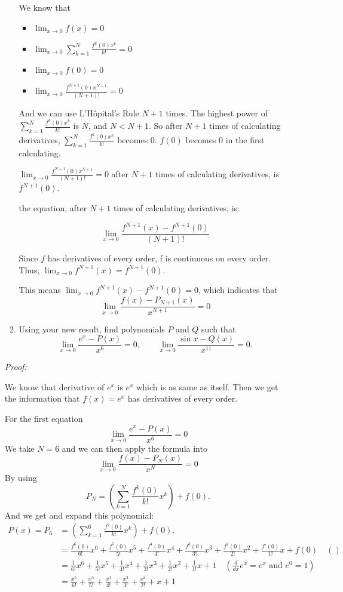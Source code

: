 \documentclass[12pt]{exam}
\newcommand{\vv}{\vspace{.1cm}}
\begin{document}
\begin{enumerate}
\begin{enumerate}
			We know that
			\begin{itemize}
				\item $\lim_{x \to 0} f(x) = 0$
				\item $\lim_{x \to 0} \sum_{k = 1}^{N} \frac{f^k(0)x^k}{k!} = 0$
				\item $\lim_{x \to 0} f(0) = 0$
				\item $\lim_{x \to 0} \frac{f^{N + 1}(0)x^{N + 1}}{(N + 1)!} = 0$
			\end{itemize}

			And we can use L'H\^{o}pital's Rule $N + 1$ times.
			The highest power of $\sum_{k = 1}^{N} \frac{f^k(0)x^k}{k!}$ is $N$, and $N < N + 1$.
			So after $N + 1$ times of calculating derivatives, $\sum_{k = 1}^{N} \frac{f^k(0)x^k}{k!}$ becomes 0.
			$f(0)$ becomes 0 in the first calculating.

			$\lim_{x \to 0} \frac{f^{N + 1}(0)x^{N + 1}}{(N + 1)!} = 0$ after $N + 1$ times of calculating derivatives, 
			is $f^{N + 1}(0)$.

			the equation, after $N + 1$ times of calculating derivatives, is:

			$$
				\lim_{x \to 0} \frac{f^{N + 1}(x) - f^{N + 1}(0)}{(N + 1)!}
			$$

			Since $f$ has derivatives of every order, f is continuous on every order. 
			Thus, $\lim_{x \to 0} f^{N + 1}(x) = f^{N + 1}(0)$. 

			This means $\lim_{x \to 0} f^{N + 1}(x) - f^{N + 1}(0) = 0$, which indicates that 
			$$\lim_{x \to 0} \frac{f(x) - P_{N+1}(x)}{x^{N+1}} = 0$$
			

		\item  Using your new result, find polynomials $P$  and $Q$ such that
			$$
				\lim_{x \to 0} \frac{e^x - P(x)}{x^6} = 0, \quad \quad \lim_{x \to 0} \frac{\sin x - Q(x)}{x^{11}} = 0.
			$$
	\end{enumerate}

\vv

\emph{Proof:}

\vv

We know that derivative of $e^x$ is $e^x$ which is as same as itself. Then we get the information that $f(x)=e^x$ has derivatives of every order.

For the first equation $$\lim_{x\to0}\frac{e^x-P(x)}{x^6}=0$$
We take $N=6$ and we can then apply the formula into $$\lim_{x \to 0} \frac{f(x) - P_N(x)}{x^N} = 0$$ By using
$$P_N = (\sum_{k = 1}^{N}\frac{f^k(0)}{k!}x^k) + f(0).$$ And we get and expand this polynomial:
\begin{align*}
    P(x)=P_6 &= (\sum_{k = 1}^{6}\frac{f^k(0)}{k!}x^k) + f(0).\\
    &=\frac{f^6(0)}{6!}x^6+\frac{f^5(0)}{5!}x^5+\frac{f^4(0)}{4!}x^4+\frac{f^3(0)}{3!}x^3+\frac{f^2(0)}{2!}x^2+\frac{f'(0)}{1!}x+f(0)\quad()\\
    &=\frac{1}{6!}x^6+\frac{1}{5!}x^5+\frac{1}{4!}x^4+\frac{1}{3!}x^3+\frac{1}{2!}x^2+\frac{1}{1!}x+1\quad(\frac{d}{dx}e^x=e^x\mbox{ and }e^0=1)\\
    &=\frac{x^6}{6!}+\frac{x^5}{5!}+\frac{x^4}{4!}+\frac{x^3}{3!}+\frac{x^2}{2!}+x+1
\end{align*}


\end{enumerate}
\end{document}

